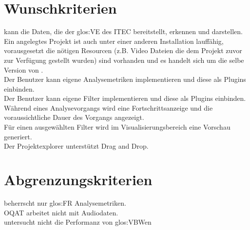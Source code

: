 \section{Wunschkriterien}
\setcounter{counterKriterien}{0}
% 
 \projektTitel kann die Daten, die der \gls{glos:VE} des \gls{ITEC} bereitstellt, erkennen und darstellen.\\
 Ein angelegtes Projekt ist auch unter einer anderen \projektTitel Installation lauffähig, vorausgesetzt die nötigen Resourcen (z.B. Video Dateien die dem Projekt zuvor zur Verfügung gestellt wurden)  sind vorhanden und es handelt sich um die selbe Version von \projektTitel.\\
 Der Benutzer kann eigene Analysemetriken implementieren und diese als Plugins einbinden.\\
 Der Benutzer kann eigene Filter implementieren und diese als Plugins einbinden.\\
 Während eines Analysevorgangs wird eine Fortschrittsanzeige und die voraussichtliche Dauer des Vorgangs angezeigt.\\
 Für einen ausgewählten Filter wird im Visualisierungsbereich eine Vorschau generiert.\\
 Der Projektexplorer unterstützt Drag and Drop.
\section{Abgrenzungskriterien}
\setcounter{counterKriterien}{0}
 \projektTitel beherrscht nur \gls{glos:FR} Analysemetriken.\\
 \gls{OQAT} arbeitet nicht mit Audiodaten.\\
 \projektTitel untersucht nicht die Performanz von \gls{glos:VBW}en\\
